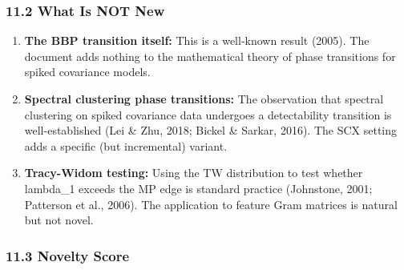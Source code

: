 \documentclass[
  12pt,
]{article}
\begin{document}
\subsubsection{11.2 What Is NOT New}\label{what-is-not-new}

\begin{enumerate}
\def\labelenumi{\arabic{enumi}.}
\item
  \textbf{The BBP transition itself:} This is a well-known result
  (2005). The document adds nothing to the mathematical theory of phase
  transitions for spiked covariance models.
\item
  \textbf{Spectral clustering phase transitions:} The observation that
  spectral clustering on spiked covariance data undergoes a
  detectability transition is well-established (Lei \& Zhu, 2018; Bickel
  \& Sarkar, 2016). The SCX setting adds a specific (but incremental)
  variant.
\item
  \textbf{Tracy-Widom testing:} Using the TW distribution to test
  whether lambda\_1 exceeds the MP edge is standard practice (Johnstone,
  2001; Patterson et al., 2006). The application to feature Gram
  matrices is natural but not novel.
\end{enumerate}

\subsubsection{11.3 Novelty Score}\label{novelty-score}
\end{document}
